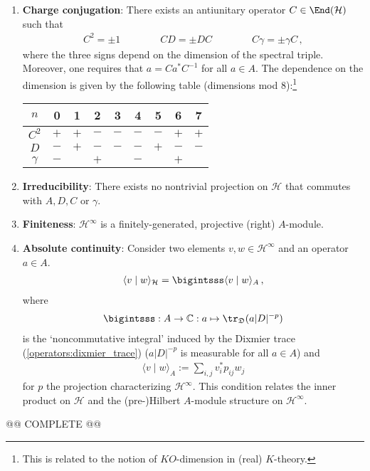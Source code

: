 \begin{remark}
\begin{enumerate}
            \item\textbf{Charge conjugation}: There exists an antiunitary operator $C\in\End(\mathcal{H})$ such that
            \begin{gather}
                C^2=\pm1\qquad\qquad CD=\pm DC\qquad\qquad C\gamma=\pm\gamma C\,,
            \end{gather}
            where the three signs depend on the dimension of the spectral triple. Moreover, one requires that $a=Ca^*C^{-1}$ for all $a\in A$. The dependence on the dimension is given by the following table (dimensions mod 8):\footnote{This is related to the notion of $K\!O$-dimension in (real) $K$-theory.}
            \begin{center}
                \begin{tabular}{|c|c|c|c|c|c|c|c|c|}
                    \hline
                    $n$&0&1&2&3&4&5&6&7\\
                    \hline
                    $C^2$&$+$&$+$&$-$&$-$&$-$&$-$&$+$&$+$\\
                    \hline
                    $D$&$-$&$+$&$-$&$-$&$-$&$+$&$-$&$-$\\
                    \hline
                    $\gamma$&$-$&&$+$&&$-$&&$+$&\\
                    \hline
                \end{tabular}
            \end{center}
            \item\textbf{Irreducibility}: There exists no nontrivial projection on $\mathcal{H}$ that commutes with $A,D,C$ or $\gamma$.
            \item\textbf{Finiteness}: $\mathcal{H}^\infty$ is a finitely-generated, projective (right) $A$-module.
            \item\textbf{Absolute continuity}: Consider two elements $v,w\in\mathcal{H}^\infty$ and an operator $a\in A$.
                \begin{gather}
                    \langle v\mid w \rangle_{\mathcal{H}} = \bigintsss\langle v\mid w \rangle_A\,,
                \end{gather}
                where
                \begin{gather}
                    \bigintsss:A\rightarrow\mathbb{C}:a\mapsto\tr_{\mathfrak{D}}(a|D|^{-p})
                \end{gather}
                is the `noncommutative integral' induced by the Dixmier trace (\cref{operators:dixmier_trace}) ($a|D|^{-p}$ is measurable for all $a\in A$) and
                \begin{gather}
                    \langle v\mid w \rangle_A := \sum_{i,j} v^*_ip_{ij}w_j
                \end{gather}
                for $p$ the projection characterizing $\mathcal{H}^\infty$. This condition relates the inner product on $\mathcal{H}$ and the (pre-)Hilbert $A$-module structure on $\mathcal{H}^\infty$.
        \end{enumerate}
        @@ COMPLETE @@
    \end{remark}

